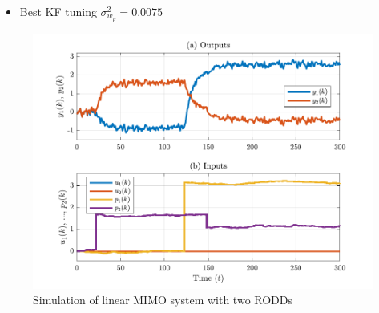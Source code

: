 \begin{itemize}
	\item Best KF tuning $\sigma_{w_p}^2=0.0075$
\end{itemize}

\begin{figure}[htp]
	\centering
	\includegraphics[width=13cm]{images/rod_obs_sim2_ioplot.pdf}
	\caption{Simulation of linear MIMO system with two \gls{RODD}s}
	\label{fig:rod-obs-sim-2-ioplot}
\end{figure}

